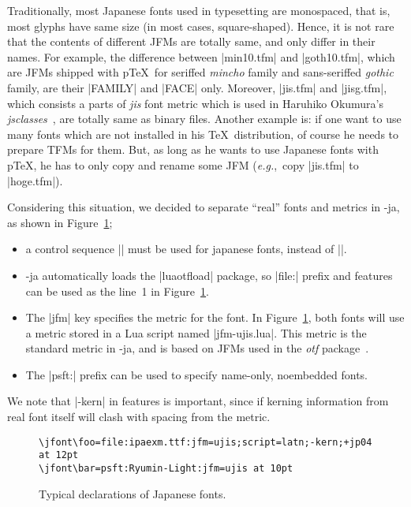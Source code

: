 \documentclass{ajt}
\begin{document}
Traditionally, most Japanese fonts used in typesetting are monospaced,
that is, most glyphs have same size (in most cases,
square-shaped). Hence, it is not rare that the contents of different
JFMs are totally same, and only differ in their names. For example, the
difference between |min10.tfm| and |goth10.tfm|, which are JFMs shipped
with p\TeX\ for seriffed \emph{mincho} family and sans-seriffed
\emph{gothic} family, are their |FAMILY| and |FACE| only. Moreover,
|jis.tfm| and |jisg.tfm|, which consists a parts of \emph{jis} font
metric which is used in Haruhiko Okumura's
\emph{jsclasses}~\cite{jsclasses}, are totally same as binary files.
Another example is: if one want to use many fonts which are not
installed in his \TeX\ distribution, of course he needs to prepare TFMs
for them. But, as long as he wants to use Japanese fonts with p\TeX, he
has to only copy and rename some JFM (\emph{e.g.},~copy |jis.tfm| to
|hoge.tfm|).

Considering this situation, we decided to separate ``real'' fonts and
metrics in \LuaTeX-ja, as shown in Figure~\ref{fig-jfdef};
\begin{itemize}
\item a control sequence |\jfont| must be used for japanese fonts, instead of |\font|.
\item \LuaTeX-ja automatically loads the |luaotfload| package, so
      |file:| prefix and features can be used as the line~1 in
      Figure~\ref{fig-jfdef}.
\item The |jfm| key specifies the metric for the font. In
      Figure~\ref{fig-jfdef}, both fonts will use a metric stored in a Lua script named 
      |jfm-ujis.lua|. This metric is the standard metric in  \LuaTeX-ja, and is based on JFMs used in the \emph{otf} package~\cite{otf}.
\item The |psft:| prefix can be used to specify name-only, noembedded
      fonts. 
\end{itemize}
We note that |-kern| in features is important, since if kerning information from real font itself will clash with spacing from the metric.

\begin{figure}
\begin{verbatim}
\jfont\foo=file:ipaexm.ttf:jfm=ujis;script=latn;-kern;+jp04 at 12pt
\jfont\bar=psft:Ryumin-Light:jfm=ujis at 10pt
\end{verbatim}
\caption{Typical declarations of Japanese fonts.}
\label{fig-jfdef}
\end{figure}
\end{document}
